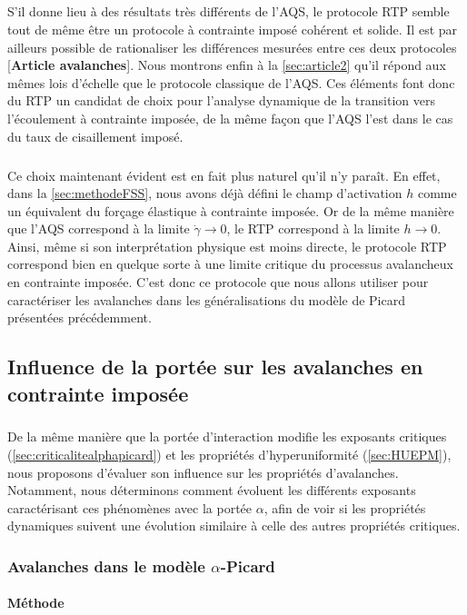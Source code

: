 \subparagraph{}S'il donne lieu à des résultats très différents de l'AQS, le protocole RTP semble tout de même être un protocole à contrainte imposé cohérent et solide. Il est par ailleurs possible de rationaliser les différences mesurées entre ces deux protocoles [\textbf{Article avalanches}]. Nous montrons enfin à la \autoref{sec:article2} qu'il répond aux mêmes lois d'échelle que le protocole classique de l'AQS. Ces éléments font donc du RTP un candidat de choix pour l'analyse dynamique de la transition vers l'écoulement à contrainte imposée, de la même façon que l'AQS l'est dans le cas du taux de cisaillement imposé. 

\subparagraph{}Ce choix maintenant évident est en fait plus naturel qu'il n'y paraît. En effet, dans la \autoref{sec:methodeFSS}, nous avons déjà défini le champ d'activation $h$ comme un équivalent du forçage élastique à contrainte imposée. Or de la même manière que l'AQS correspond à la limite $\dot{\gamma} \rightarrow 0$, le RTP correspond à la limite $h\rightarrow 0$. Ainsi, même si son interprétation physique est moins directe, le protocole RTP correspond bien en quelque sorte à une limite critique du processus avalancheux en contrainte imposée. C'est donc ce protocole que nous allons utiliser pour caractériser les avalanches dans les généralisations du modèle de Picard présentées précédemment.

\subsection{Influence de la portée sur les avalanches en contrainte imposée}

\subparagraph{}De la même manière que la portée d'interaction modifie les exposants critiques (\autoref{sec:criticalitealphapicard}) et les propriétés d'hyperuniformité (\autoref{sec:HUEPM}), nous proposons d'évaluer son influence sur les propriétés d'avalanches. Notamment, nous déterminons comment évoluent les différents exposants caractérisant ces phénomènes avec la portée $\alpha$, afin de voir si les propriétés dynamiques suivent une évolution similaire à celle des autres propriétés critiques.

\subsubsection{Avalanches dans le modèle $\alpha$-Picard}

\label{sec:Av_PicardMain}

\paragraph{Méthode}

